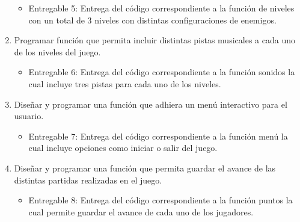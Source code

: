 \documentclass[12pt,letterpaper]{article}
\begin{document}
\begin{enumerate}
 
        \begin{itemize}
            \item Entregable 5: Entrega del código correspondiente a  la función de niveles con un total de 3 niveles con distintas configuraciones de enemigos.  

            
        \end{itemize}
        
    \item  Programar función que permita incluir distintas pistas musicales a cada uno de los niveles del juego.   
    
 
        \begin{itemize}
            \item Entregable 6: Entrega del código correspondiente a  la función sonidos la cual incluye tres pistas para cada uno de los niveles. 

            
        \end{itemize}
        
    \item Diseñar y programar una  función que adhiera un menú interactivo para el usuario.   
    
 
        \begin{itemize}
            \item Entregable 7: Entrega del código correspondiente a  la función menú la cual incluye opciones como iniciar o salir del juego. 

            
        \end{itemize}
    
    \item Diseñar y programar una función que permita guardar el avance de las distintas partidas realizadas en el juego. 
 
        \begin{itemize}
            \item Entregable 8: Entrega del código correspondiente a  la función puntos la cual permite guardar el avance de cada uno de los jugadores. 

            
        \end{itemize}
        
\end{enumerate}

  
\end{document}
